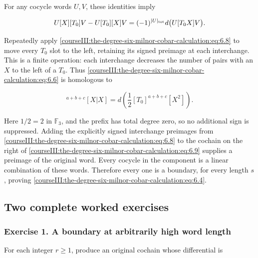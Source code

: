 For any cocycle words \(U,V\), these identities imply

\begin{equation}
U[X][T_0]V-U[T_0][X]V
   =(-1)^{|U|_{\rm tot}}d\bigl(U[T_0X]V\bigr).
 \label{courseIII:the-degree-six-milnor-cobar-calculation:eq:6.8}
\end{equation}

Repeatedly apply \eqref{courseIII:the-degree-six-milnor-cobar-calculation:eq:6.8} to move every \(T_0\) slot to the left, retaining its signed preimage at each interchange. This is a finite operation: each interchange decreases the number of pairs with an \(X\) to the left of a \(T_0\). Thus \eqref{courseIII:the-degree-six-milnor-cobar-calculation:eq:6.6} is homologous to

\begin{equation}
[T_0]^{a+b+c}[X|X]
   =d\left(\frac12[T_0]^{a+b+c}[X^2]\right).
 \label{courseIII:the-degree-six-milnor-cobar-calculation:eq:6.9}
\end{equation}

Here \(1/2=2\) in \(\mathbb F _3\), and the prefix has total degree zero, so no additional sign is suppressed. Adding the explicitly signed interchange preimages from \eqref{courseIII:the-degree-six-milnor-cobar-calculation:eq:6.8} to the cochain on the right of \eqref{courseIII:the-degree-six-milnor-cobar-calculation:eq:6.9} supplies a preimage of the original word. Every cocycle in the component is a linear combination of these words. Therefore every one is a boundary, for every length \(s\), proving \eqref{courseIII:the-degree-six-milnor-cobar-calculation:eq:6.4}.

\label{courseIII:the-degree-six-milnor-cobar-calculation:six-cobar-exercises}

\subsection{Two complete worked exercises}
\label{courseIII:the-degree-six-milnor-cobar-calculation:section-7}

\subsubsection{Exercise 1. A boundary at arbitrarily high word length}
\label{courseIII:the-degree-six-milnor-cobar-calculation:exercise-1}

\label{courseIII:milnor-cobar:7.1}

For each integer \(r\geq1\), produce an original cochain whose differential is

